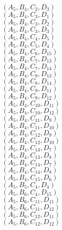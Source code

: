 \documentclass[14pt]{article}
\begin{document}
    $({A}_{5}, {B}_{4}, {C}_{2}, {D}_{3}) $ \\ 
    $({A}_{5}, {B}_{4}, {C}_{3}, {D}_{1}) $ \\ 
    $({A}_{5}, {B}_{4}, {C}_{3}, {D}_{2}) $ \\ 
    $({A}_{5}, {B}_{4}, {C}_{3}, {D}_{3}) $ \\ 
    $({A}_{5}, {B}_{4}, {C}_{4}, {D}_{5}) $ \\ 
    $({A}_{5}, {B}_{4}, {C}_{5}, {D}_{4}) $ \\ 
    $({A}_{5}, {B}_{4}, {C}_{6}, {D}_{15}) $ \\ 
    $({A}_{5}, {B}_{4}, {C}_{7}, {D}_{13}) $ \\ 
    $({A}_{5}, {B}_{4}, {C}_{7}, {D}_{14}) $ \\ 
    $({A}_{5}, {B}_{4}, {C}_{8}, {D}_{13}) $ \\ 
    $({A}_{5}, {B}_{4}, {C}_{8}, {D}_{14}) $ \\ 
    $({A}_{5}, {B}_{4}, {C}_{9}, {D}_{11}) $ \\ 
    $({A}_{5}, {B}_{4}, {C}_{9}, {D}_{12}) $ \\ 
    $({A}_{5}, {B}_{4}, {C}_{10}, {D}_{11}) $ \\ 
    $({A}_{5}, {B}_{4}, {C}_{10}, {D}_{12}) $ \\ 
    $({A}_{5}, {B}_{4}, {C}_{11}, {D}_{9}) $ \\ 
    $({A}_{5}, {B}_{4}, {C}_{11}, {D}_{10}) $ \\ 
    $({A}_{5}, {B}_{4}, {C}_{12}, {D}_{9}) $ \\ 
    $({A}_{5}, {B}_{4}, {C}_{12}, {D}_{10}) $ \\ 
    $({A}_{5}, {B}_{4}, {C}_{13}, {D}_{7}) $ \\ 
    $({A}_{5}, {B}_{4}, {C}_{13}, {D}_{8}) $ \\ 
    $({A}_{5}, {B}_{4}, {C}_{14}, {D}_{7}) $ \\ 
    $({A}_{5}, {B}_{4}, {C}_{14}, {D}_{8}) $ \\ 
    $({A}_{5}, {B}_{4}, {C}_{15}, {D}_{6}) $ \\ 
    $({A}_{5}, {B}_{5}, {C}_{4}, {D}_{4}) $ \\ 
    $({A}_{5}, {B}_{6}, {C}_{4}, {D}_{15}) $ \\ 
    $({A}_{5}, {B}_{6}, {C}_{11}, {D}_{11}) $ \\ 
    $({A}_{5}, {B}_{6}, {C}_{11}, {D}_{12}) $ \\ 
    $({A}_{5}, {B}_{6}, {C}_{12}, {D}_{11}) $ \\ 
    $({A}_{5}, {B}_{6}, {C}_{12}, {D}_{12}) $ \\ 
\end{document}
